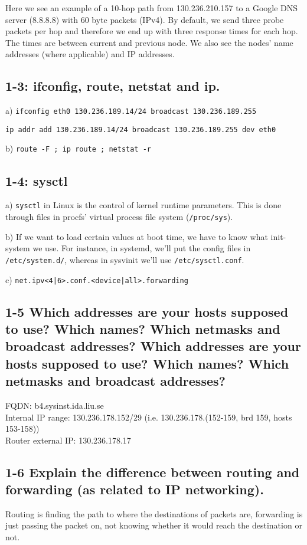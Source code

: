 Here we see an example of a 10-hop path from 130.236.210.157 to a Google DNS server (8.8.8.8) with 60 byte packets (IPv4). By default, we send three probe packets per hop and therefore we end up with three response times for each hop. The times are between current and previous node. We also see the nodes' name addresses (where applicable) and IP addresses.

\subsection{1-3: ifconfig, route, netstat and ip.}
a)
\verb=ifconfig eth0 130.236.189.14/24 broadcast 130.236.189.255=

\verb=ip addr add 130.236.189.14/24 broadcast 130.236.189.255 dev eth0=

b) \verb=route -F ; ip route ; netstat -r=

\subsection{1-4: sysctl}
a) \verb=sysctl= in Linux is the control of kernel runtime parameters. This is done through files in procfs' virtual process file system (\verb=/proc/sys=).

b) If we want to load certain values at boot time, we have to know what init-system we use. For instance, in systemd, we'll put the config files in \verb=/etc/system.d/=, whereas in sysvinit we'll use \verb=/etc/sysctl.conf=.

c) \verb=net.ipv<4|6>.conf.<device|all>.forwarding=

\subsection{1-5 Which addresses are your hosts supposed to use? Which names? Which netmasks and broadcast addresses? Which addresses are your hosts supposed to use? Which names? Which netmasks and broadcast addresses?}
FQDN: b4.sysinst.ida.liu.se\\
Internal IP range: 130.236.178.152/29 (i.e. 130.236.178.(152-159, brd 159, hosts 153-158))\\
Router external IP: 130.236.178.17

\subsection{1-6 Explain the difference between routing and forwarding (as related to IP networking).}
Routing is finding the path to where the destinations of packets are, forwarding is just passing the packet on, not knowing whether it would reach the destination or not.

